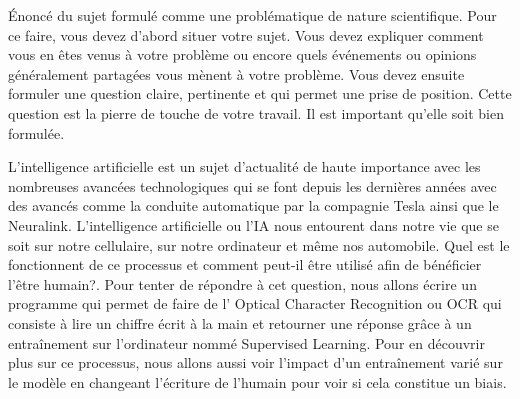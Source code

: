 Énoncé du sujet formulé comme une problématique de nature scientifique. Pour ce faire, vous devez
d’abord situer votre sujet. Vous devez expliquer comment vous en êtes venus à votre problème ou encore
quels événements ou opinions généralement partagées vous mènent à votre problème. Vous devez ensuite
formuler une question claire, pertinente et qui permet une prise de position. Cette question est la pierre
de touche de votre travail. Il est important qu’elle soit bien formulée. 

L'intelligence artificielle est un sujet d'actualité de haute importance avec les
nombreuses avancées
technologiques qui se font depuis les dernières années avec des avancés comme la
conduite automatique
par la compagnie Tesla ainsi que le Neuralink. L'intelligence artificielle ou
l'IA nous entourent
dans notre vie que se soit sur notre cellulaire, sur notre ordinateur et même nos automobile.
Quel est le fonctionnent de ce processus et comment peut-il être utilisé afin de
bénéficier l’être humain?. Pour tenter de répondre à cet question, nous allons
écrire un programme qui permet de faire de l' Optical Character Recognition ou OCR
qui consiste à lire un chiffre écrit à la main et retourner une réponse grâce à
un entraînement sur l'ordinateur nommé Supervised Learning. Pour en découvrir
plus sur ce processus, nous allons aussi voir l'impact d'un entraînement varié
sur le modèle en changeant l'écriture de l'humain pour voir si cela constitue un
biais.
